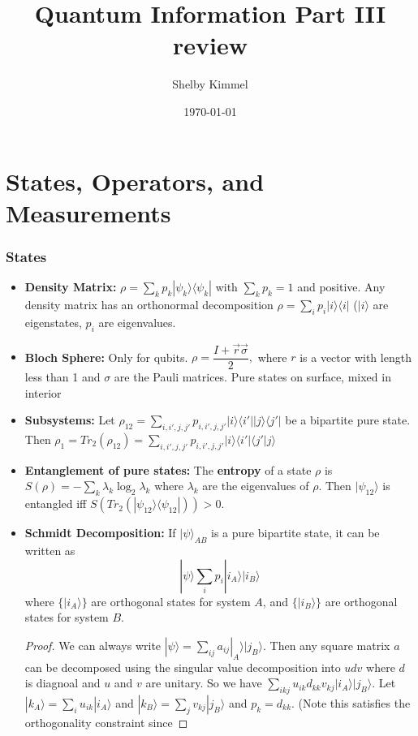 \documentclass[12pt]{article}
\begin{document}
\title{Quantum Information Part III review}
\author{Shelby Kimmel}
\date{\today}

\maketitle

\part{States, Operators, and Measurements}
\section{States}

\begin{itemize}
\item{\bf{Density Matrix:}} $\rho=\sum_kp_k|\psi_k\rangle\langle\psi_k|$ with $\sum_kp_k=1$ and positive. Any density matrix has an orthonormal decomposition $\rho=\sum_ip_i|i\rangle\langle i|$ ($|i\rangle$ are eigenstates, $p_i$ are eigenvalues. 
\item{\bf{Bloch Sphere:}} Only for qubits. $\rho=\dfrac{I+\vec{r}\vec{\sigma}}{2},$ where $r$ is a vector with length less than 1 and $\sigma$ are the Pauli matrices. Pure states on surface, mixed in interior
\item{\bf{Subsystems:}} Let $\rho_{12}=\sum_{i,i',j,j'}p_{i,i',j,j'}|i\rangle\langle i'||j\rangle\langle j'|$ be a bipartite pure state. Then $\rho_1=Tr_2(\rho_{12})=\sum_{i,i',j,j'}p_{i,i',j,j'}|i\rangle\langle i'|\langle j'|j\rangle$
\item{\bf{Entanglement of pure states:}} The {\bf{entropy}} of a state $\rho$ is $S(\rho)=-\sum_k\lambda_k\log_2\lambda_k$ where $\lambda_k$ are the eigenvalues of $\rho$.  Then $|\psi_{12}\rangle$ is entangled iff $S(Tr_2(|\psi_{12}\rangle\langle\psi_{12}|))>0$.
\item {\bf{Schmidt Decomposition:}} If $|\psi\rangle_{AB}$ is a pure bipartite state, it can be written as
\begin{equation}
|\psi\rangle\sum_ip_i|i_A\rangle|i_B\rangle
\end{equation}
where $\{|i_A\rangle\}$ are orthogonal states for system $A$, and $\{|i_B\rangle\}$ are orthogonal states for system $B$.
\begin{proof}
We can always write $|\psi\rangle=\sum_{ij}a_{ij}|_A\rangle|j_B\rangle$. Then any square matrix $a$ can be decomposed using the singular value decomposition into $udv$ where $d$ is diagnoal and $u$ and $v$ are unitary. So we have $\sum_{ikj}u_{ik}d_{kk}v_{kj}|i_A\rangle|j_B\rangle$. Let $|k_A\rangle=\sum_iu_{ik}|i_A\rangle$ and $|k_B\rangle=\sum_jv_{kj}|j_B\rangle$ and $p_k=d_{kk}$. (Note this satisfies the orthogonality constraint since

\end{proof}
\end{itemize}
\end{document}
